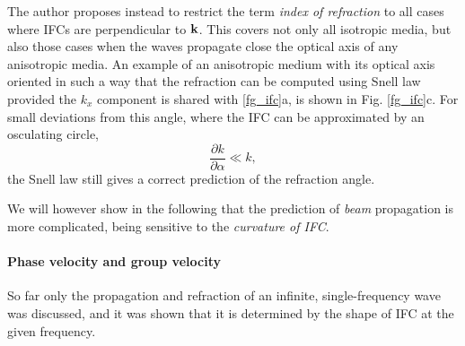 The author proposes instead to restrict the term \textit{index of refraction} to all cases where IFCs are perpendicular to ${\mathbf{k}}$. This covers not only all isotropic media, but also those cases when the waves propagate close the optical axis of any anisotropic media. An example of an anisotropic medium with its optical axis oriented in such a way that the refraction can be computed using Snell law provided the $k_x$ component is shared with \ref{fg_ifc}a, is shown in Fig. \ref{fg_ifc}c. For small deviations from this angle, where the IFC can be approximated by an osculating circle, 
\begin{equation} \frac{\partial k}{\partial \alpha} \ll k,\label{eq_osculating}\end{equation}
the Snell law still gives a correct prediction of the refraction angle. 

We will however show in the following that the prediction of \textit{beam} propagation is more complicated, being sensitive to the \textit{curvature of IFC}. 

\paragraph{Phase velocity and group velocity}  %
So far only the propagation and refraction of an infinite, single-frequency wave was discussed, and it was shown that it is determined by the shape of IFC at the given frequency. %

